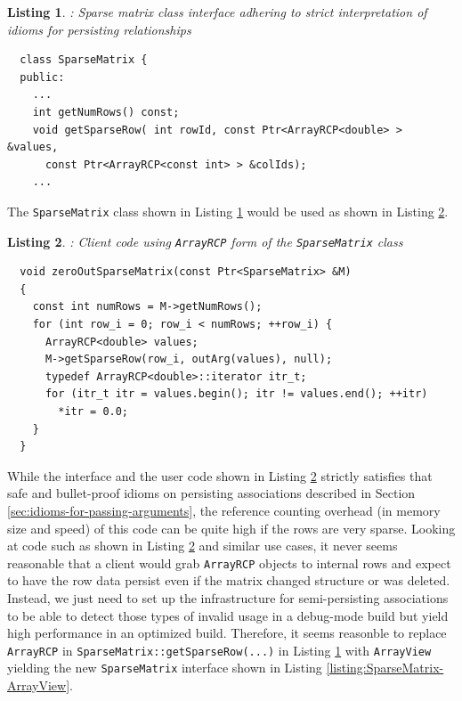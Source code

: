 \documentclass[pdf,ps2pdf,11pt]{SANDreport}
\newtheorem{listing}{Listing}
\begin{document}
\begin{listing}: Sparse matrix class interface adhering to strict
interpretation of idioms for persisting relationships  \\
\label{listing:SparseMatrix-ArrayRCP}
{\small\begin{verbatim}
  class SparseMatrix {
  public:
    ...
    int getNumRows() const;
    void getSparseRow( int rowId, const Ptr<ArrayRCP<double> > &values,
      const Ptr<ArrayRCP<const int> > &colIds);
    ...
\end{verbatim}}
\end{listing}


The {}\texttt{SparseMatrix} class shown in Listing
{}\ref{listing:SparseMatrix-ArrayRCP} would be used as shown in
Listing {}\ref{listing:zeroOutSparseMatrix-ArrayRCP}.


\begin{listing}: Client code using {}\texttt{ArrayRCP} form of the
 {}\texttt{SparseMatrix} class  \\
\label{listing:zeroOutSparseMatrix-ArrayRCP}
{\small\begin{verbatim}
  void zeroOutSparseMatrix(const Ptr<SparseMatrix> &M)
  {
    const int numRows = M->getNumRows();
    for (int row_i = 0; row_i < numRows; ++row_i) {
      ArrayRCP<double> values;
      M->getSparseRow(row_i, outArg(values), null);
      typedef ArrayRCP<double>::iterator itr_t;
      for (itr_t itr = values.begin(); itr != values.end(); ++itr)
        *itr = 0.0;
    }
  }
\end{verbatim}}
\end{listing}


While the interface and the user code shown in Listing
{}\ref{listing:zeroOutSparseMatrix-ArrayRCP} strictly satisfies that
safe and bullet-proof idioms on persisting associations described in
Section {}\ref{sec:idioms-for-passing-arguments}, the reference
counting overhead (in memory size and speed) of this code can be quite
high if the rows are very sparse.  Looking at code such as shown in
Listing {}\ref{listing:zeroOutSparseMatrix-ArrayRCP} and similar use
cases, it never seems reasonable that a client would grab
{}\texttt{ArrayRCP} objects to internal rows and expect to have the
row data persist even if the matrix changed structure or was deleted.
Instead, we just need to set up the infrastructure for semi-persisting
associations to be able to detect those types of invalid usage in a
debug-mode build but yield high performance in an optimized build.
Therefore, it seems reasonble to replace {}\texttt{ArrayRCP} in
{}\texttt{SparseMatrix::getSparseRow(...)} in Listing
{}\ref{listing:SparseMatrix-ArrayRCP} with {}\texttt{ArrayView}
yielding the new {}\texttt{SparseMatrix} interface shown in Listing
{}\ref{listing:SparseMatrix-ArrayView}.
\end{document}
